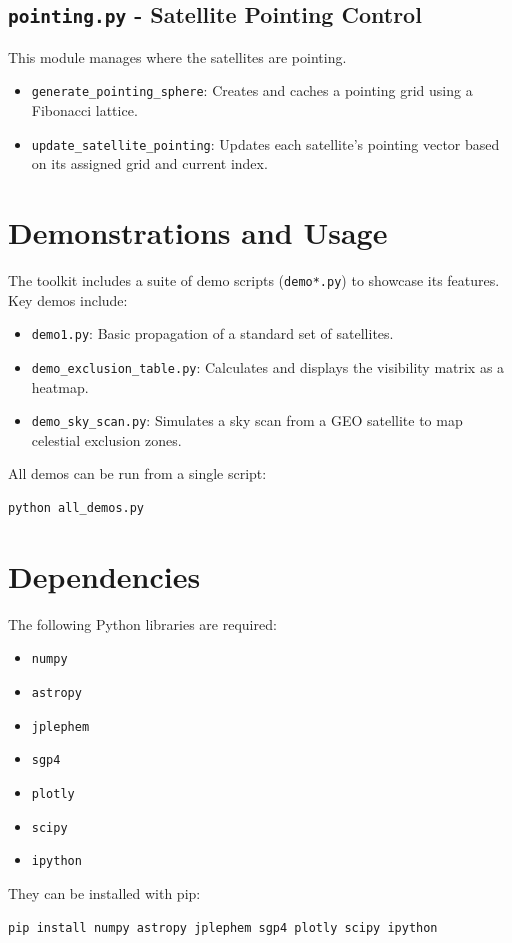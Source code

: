 \documentclass[11pt]{article}
\begin{document}
\subsection{\texttt{pointing.py} - Satellite Pointing Control}
This module manages where the satellites are pointing.
\begin{itemize}
    \item \texttt{generate\_pointing\_sphere}: Creates and caches a pointing grid using a Fibonacci lattice.
    \item \texttt{update\_satellite\_pointing}: Updates each satellite's pointing vector based on its assigned grid and current index.
\end{itemize}

\section{Demonstrations and Usage}
The toolkit includes a suite of demo scripts (\texttt{demo*.py}) to showcase its features. Key demos include:
\begin{itemize}
    \item \texttt{demo1.py}: Basic propagation of a standard set of satellites.
    \item \texttt{demo\_exclusion\_table.py}: Calculates and displays the visibility matrix as a heatmap.
    \item \texttt{demo\_sky\_scan.py}: Simulates a sky scan from a GEO satellite to map celestial exclusion zones.
\end{itemize}
All demos can be run from a single script:
\begin{verbatim}
python all_demos.py
\end{verbatim}

\section{Dependencies}
The following Python libraries are required:
\begin{itemize}
    \item \texttt{numpy}
    \item \texttt{astropy}
    \item \texttt{jplephem}
    \item \texttt{sgp4}
    \item \texttt{plotly}
    \item \texttt{scipy}
    \item \texttt{ipython}
\end{itemize}
They can be installed with pip:
\begin{verbatim}
pip install numpy astropy jplephem sgp4 plotly scipy ipython
\end{verbatim}
\end{document}
